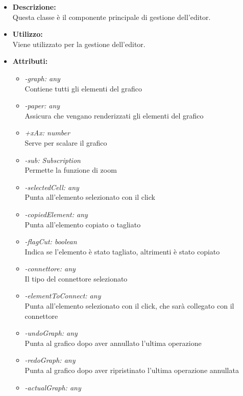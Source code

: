 \begin{itemize}
	\item \textbf{Descrizione:}\\
	Questa classe è il componente principale di gestione dell'editor.
	\item \textbf{Utilizzo:}\\
	Viene utilizzato per la gestione dell'editor.
	\item \textbf{Attributi:}
		\begin{itemize}
			\item \emph{-graph: any}\\
            Contiene tutti gli elementi del grafico
            \item \emph{-paper: any}\\
            Assicura che vengano renderizzati gli elementi del grafico
            \item \emph{+xAx: number}\\
            Serve per scalare il grafico
            \item \emph{-sub: Subscription}\\
            Permette la funzione di zoom
            \item \emph{-selectedCell: any}\\
            Punta all'elemento selezionato con il click
            \item \emph{-copiedElement: any}\\
			Punta all'elemento copiato o tagliato
			\item \emph{-flagCut: boolean}\\
			Indica se l'elemento è stato tagliato, altrimenti è stato copiato
            \item \emph{-connettore: any}\\
            Il tipo del connettore selezionato
            \item \emph{-elementToConnect: any}\\
            Punta all'elemento selezionato con il click, che sarà collegato con il connettore
			\item \emph{-undoGraph: any}\\
			Punta al grafico dopo aver annullato l'ultima operazione
			\item \emph{-redoGraph: any}\\
			Punta al grafico dopo aver ripristinato l'ultima operazione annullata
			\item \emph{-actualGraph: any}\\

\end{itemize}
\end{itemize}
